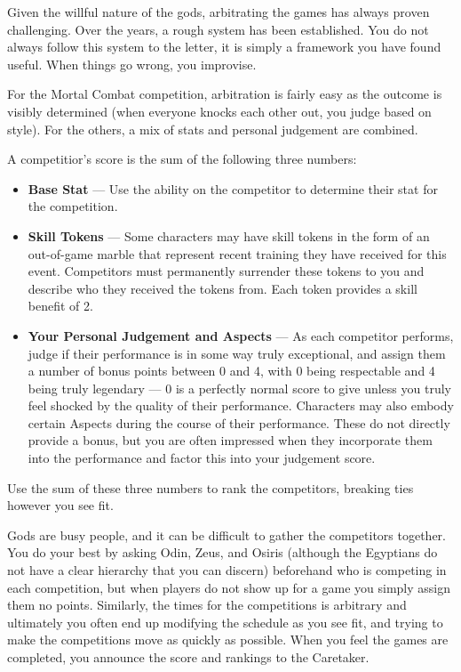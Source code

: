 \documentclass[green]{guardians}
\begin{document}
\name{\gArbiter{}}

Given the willful nature of the gods, arbitrating the games has always proven challenging. Over the years, a rough system has been established. You do not always follow this system to the letter, it is simply a framework you have found useful. When things go wrong, you improvise.

For the Mortal Combat competition, arbitration is fairly easy as the outcome is visibly determined (when everyone knocks each other out, you judge based on style). For the others, a mix of stats and personal judgement are combined.

A competitior's score is the sum of the following three numbers:

\begin{itemize}
  \item \textbf{Base Stat} --- Use the \aExamine{} ability on the competitor to determine their stat for the competition.
  \item \textbf{Skill Tokens} --- Some characters may have skill tokens in the form of an out-of-game marble that represent recent training they have received for this event. Competitors must permanently surrender these tokens to you and describe who they received the tokens from. Each token provides a skill benefit of 2.
  \item \textbf{Your Personal Judgement and Aspects} --- As each competitor performs, judge if their performance is in some way truly exceptional, and assign them a number of bonus points between 0 and 4, with 0 being respectable and 4 being truly legendary --- 0 is a perfectly normal score to give unless you truly feel shocked by the quality of their performance. Characters may also embody certain Aspects during the course of their performance. These do not directly provide a bonus, but you are often impressed when they incorporate them into the performance and factor this into your judgement score.
	
\end{itemize}

Use the sum of these three numbers to rank the competitors, breaking ties however you see fit.

Gods are busy people, and it can be difficult to gather the competitors together. You do your best by asking Odin, Zeus, and Osiris (although the Egyptians do not have a clear hierarchy that you can discern) beforehand who is competing in each competition, but when players do not show up for a game you simply assign them no points. Similarly, the times for the competitions is arbitrary and ultimately you often end up modifying the schedule as you see fit, and trying to make the competitions move as quickly as possible. When you feel the games are completed, you announce the score and rankings to the Caretaker.
\end{document}
